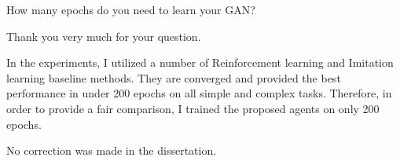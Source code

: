 

\begin{revcomment}
  How many epochs do you need to learn your GAN?
\end{revcomment}
\begin{revresponse}
  Thank you very much for your question.

  In the experiments, I utilized a number of Reinforcement learning and Imitation learning baseline methods.
  They are converged and provided the best performance in under 200 epochs on all simple and complex tasks.
  Therefore, in order to provide a fair comparison, I trained the proposed agents on only 200 epochs.

  \begin{correction}
    No correction was made in the dissertation.
  \end{correction}
\end{revresponse}





